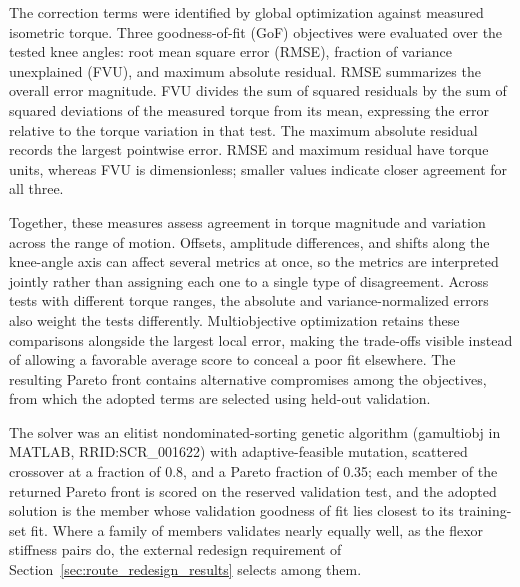 \documentclass[utf8]{FrontiersinHarvard} %
\begin{document}
The correction terms were identified by global optimization against measured isometric torque. Three goodness-of-fit (GoF) objectives were evaluated over the tested knee angles: root mean square error (RMSE), fraction of variance unexplained (FVU), and maximum absolute residual. RMSE summarizes the overall error magnitude. FVU divides the sum of squared residuals by the sum of squared deviations of the measured torque from its mean, expressing the error relative to the torque variation in that test. The maximum absolute residual records the largest pointwise error. RMSE and maximum residual have torque units, whereas FVU is dimensionless; smaller values indicate closer agreement for all three.

Together, these measures assess agreement in torque magnitude and variation across the range of motion. Offsets, amplitude differences, and shifts along the knee-angle axis can affect several metrics at once, so the metrics are interpreted jointly rather than assigning each one to a single type of disagreement. Across tests with different torque ranges, the absolute and variance-normalized errors also weight the tests differently. Multiobjective optimization retains these comparisons alongside the largest local error, making the trade-offs visible instead of allowing a favorable average score to conceal a poor fit elsewhere. The resulting Pareto front contains alternative compromises among the objectives, from which the adopted terms are selected using held-out validation.

The solver was an elitist nondominated-sorting genetic algorithm (gamultiobj in MATLAB, RRID:SCR\_001622) with adaptive-feasible mutation, scattered crossover at a fraction of 0.8, and a Pareto fraction of 0.35; each member of the returned Pareto front is scored on the reserved validation test, and the adopted solution is the member whose validation goodness of fit lies closest to its training-set fit. Where a family of members validates nearly equally well, as the flexor stiffness pairs do, the external redesign requirement of Section~\ref{sec:route_redesign_results} selects among them.
\end{document}
